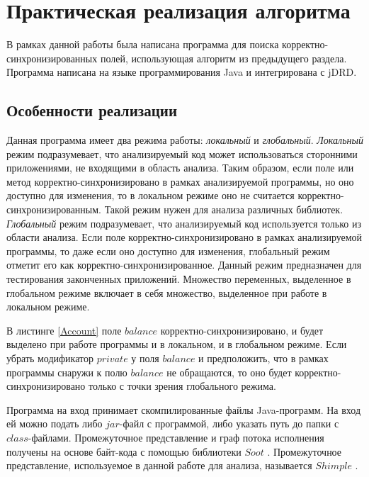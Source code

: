 \chapter{Практическая реализация алгоритма}

В рамках данной работы была написана программа для поиска корректно-синхронизированных полей, использующая алгоритм из предыдущего раздела. Программа написана на языке программирования Java и интегрирована с jDRD.

\FloatBarrier
\section{Особенности реализации}
Данная программа имеет два режима работы: \emph{локальный} и \emph{глобальный}. \emph{Локальный} режим подразумевает, что анализируемый код
может использоваться сторонними приложениями, не входящими в область анализа. Таким образом, если поле или метод корректно-синхронизировано в рамках анализируемой программы, но оно доступно для изменения, то в локальном режиме оно не считается корректно-синхронизированным. Такой режим нужен для анализа различных библиотек. \emph{Глобальный} режим подразумевает, что 
анализируемый код используется только из области анализа. Если поле корректно-синхронизировано в рамках анализируемой программы, то даже если оно доступно для изменения, глобальный режим отметит его как корректно-синхронизированное. Данный режим предназначен для тестирования законченных приложений. Множество переменных, выделенное в глобальном режиме включает в себя множество, выделенное при работе в локальном режиме.



В листинге \ref{Account} поле $balance$ корректно-синхронизировано, и будет выделено при работе программы и в локальном, и в глобальном режиме. Если убрать модификатор $private$ у поля $balance$ и предположить, что в рамках программы снаружи к полю $balance$ не обращаются, то оно будет корректно-синхронизировано только с точки зрения глобального режима.



Программа на вход принимает скомпилированные файлы Java-программ. На вход ей можно подать либо $jar$-файл с программой, либо указать путь до папки с $class$-файлами.  Промежуточное представление и граф потока исполнения получены на основе байт-кода с помощью библиотеки $Soot$ \cite{SootPage}. Промежуточное представление, используемое в данной работе для анализа, называется $Shimple$ \cite{Soot}.



